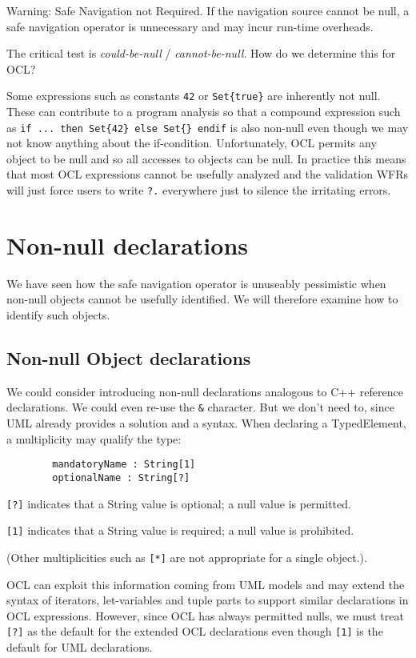 \documentclass{llncs}
\begin{document}
Warning: Safe Navigation not Required. If the navigation source cannot be null, a safe navigation operator is unnecessary and may incur run-time overheads.

The critical test is \emph{could-be-null} / \emph{cannot-be-null}. How do we determine this for OCL?

Some expressions such as constants \verb|42| or \verb|Set{true}| are inherently not null. These can contribute to a program analysis so that a compound expression such as \verb|if ... then Set{42} else Set{} endif| is also non-null even though we may not know anything about the if-condition. Unfortunately, OCL permits any object to be null and so all accesses to objects can be null. In practice this means that most OCL expressions cannot be usefully analyzed and the validation WFRs will just force users to write \verb|?.| everywhere just to silence the irritating errors. 

\section{Non-null declarations}\label{Non-null declarations}

We have seen how the safe navigation operator is unuseably pessimistic when non-null objects cannot be usefully identified. We will therefore examine how to identify such objects. 

\subsection{Non-null Object declarations}

We could consider introducing non-null declarations analogous to C++ reference declarations. We could even re-use the \verb|&| character. But we don't need to, since UML already provides a solution and a syntax. When declaring a TypedElement, a multiplicity may qualify the type:

\begin{verbatim}
        mandatoryName : String[1]
        optionalName : String[?]
\end{verbatim}

\verb|[?]| indicates that a String value is optional; a null value is permitted.

\verb|[1]| indicates that a String value is required; a null value is prohibited.

(Other multiplicities such as \verb|[*]| are not appropriate for a single object.).

OCL can exploit this information coming from UML models and may extend the syntax of iterators, let-variables and tuple parts to support similar declarations in OCL expressions. However, since OCL has always permitted nulls, we must treat \verb|[?]| as the default for the extended OCL declarations even though \verb|[1]| is the default for UML declarations.
\end{document}
